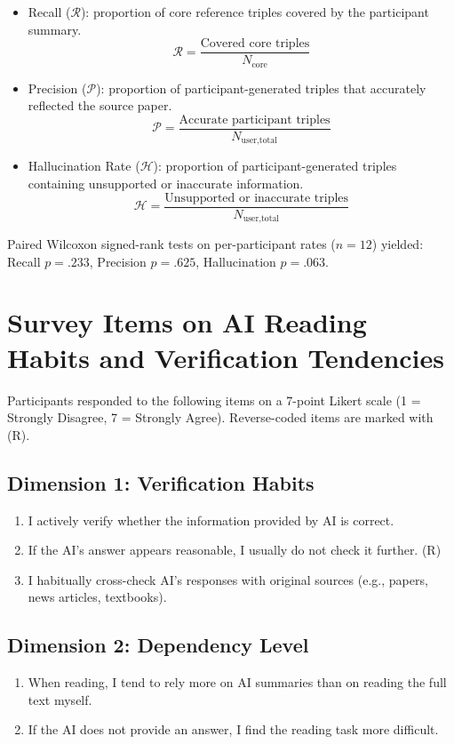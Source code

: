 \documentclass[manuscript,review,anonymous]{acmart}
\begin{document}
\begin{itemize}[noitemsep, leftmargin=*]

\item Recall ($\mathcal{R}$): proportion of core reference triples covered by the participant summary.
$$
\mathcal{R} = \frac{\text{Covered core triples}}{N_{\text{core}}}
$$

\item Precision ($\mathcal{P}$): proportion of participant-generated triples that accurately reflected the source paper.
$$
\mathcal{P} = \frac{\text{Accurate participant triples}}{N_{\text{user,total}}}
$$

\item Hallucination Rate ($\mathcal{H}$): proportion of participant-generated triples containing unsupported or inaccurate information.
$$
\mathcal{H} = \frac{\text{Unsupported or inaccurate triples}}{N_{\text{user,total}}}
$$

\end{itemize}

Paired Wilcoxon signed-rank tests on per-participant rates ($n=12$) yielded: Recall $p=.233$, Precision $p=.625$, Hallucination $p=.063$.

\section{Survey Items on AI Reading Habits and Verification Tendencies}
\label{appendix:pretest-survey}

Participants responded to the following items on a 7-point Likert scale 
(1 = Strongly Disagree, 7 = Strongly Agree). 
Reverse-coded items are marked with (R).

\subsection*{Dimension 1: Verification Habits}
\begin{enumerate}[label=\arabic*.]
 \item I actively verify whether the information provided by AI is correct. 
 \item If the AI’s answer appears reasonable, I usually do not check it further. (R)
 \item I habitually cross-check AI’s responses with original sources (e.g., papers, news articles, textbooks).
\end{enumerate}

\subsection*{Dimension 2: Dependency Level}
\begin{enumerate}[label=\arabic*.]
 \item When reading, I tend to rely more on AI summaries than on reading the full text myself.
 \item If the AI does not provide an answer, I find the reading task more difficult.
\end{enumerate}
\end{document}
